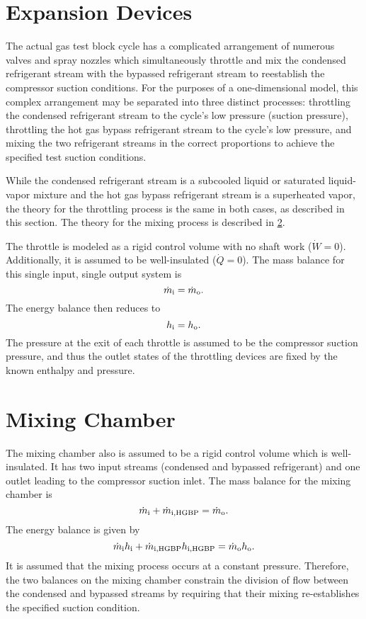 \section{Expansion Devices} \label{sec:Expand}
The actual gas test block cycle has a complicated arrangement 
of numerous valves and spray nozzles which simultaneously throttle and mix 
the condensed refrigerant stream with the bypassed refrigerant stream 
to reestablish the compressor suction conditions.
For the purposes of a one-dimensional model, this complex arrangement
may be separated into three distinct processes: 
throttling the condensed refrigerant stream to the cycle's low pressure (suction pressure),
throttling the hot gas bypass refrigerant stream to the cycle's low pressure, and
mixing the two refrigerant streams in the correct proportions 
to achieve the specified test suction conditions.

While the condensed refrigerant stream is a subcooled liquid 
or saturated liquid-vapor mixture and the hot gas bypass refrigerant stream
is a superheated vapor, the theory for the throttling process is the same
in both cases, as described in this section.
The theory for the mixing process is described in \cref{sec:Mixing}.

The throttle is modeled as a rigid control volume with no shaft work ($\dot{W}=0$).
Additionally, it is assumed to be well-insulated ($\dot{Q}=0$). The mass balance for this single input,
single output system is
\begin{equation}
  \dot{m}_{\text{i}} = \dot{m}_{\text{o}}.
\end{equation}
The energy balance then reduces to
\begin{equation}
  h_{\text{i}} = h_{\text{o}}.
\end{equation}
The pressure at the exit of each throttle is assumed to be the 
compressor suction pressure, and thus the outlet states of the
throttling devices are fixed by the known enthalpy and pressure.

\section{Mixing Chamber} \label{sec:Mixing}
The mixing chamber also is assumed to be a rigid control volume which is well-insulated.
It has two input streams (condensed and bypassed refrigerant) and one outlet leading to the
compressor suction inlet.
The mass balance for the mixing chamber is
\begin{equation}
  \dot{m}_{\text{i}} + \dot{m}_{\text{i},\text{HGBP}} = \dot{m}_{\text{o}}.
\end{equation}
The energy balance is given by
\begin{equation}
  \dot{m}_{\text{i}}h_{\text{i}} + \dot{m}_{\text{i},\text{HGBP}}h_{\text{i},\text{HGBP}} = \dot{m}_{\text{o}}h_{\text{o}}.
\end{equation}
It is assumed that the mixing process occurs at a constant pressure.
Therefore, the two balances on the mixing chamber constrain the division of flow between
the condensed and bypassed streams by requiring that their mixing re-establishes
the specified suction condition.
